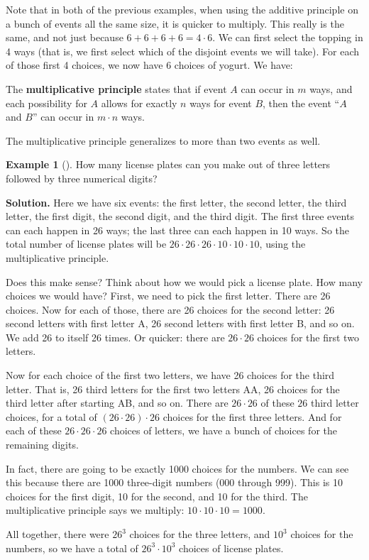 \documentclass[10pt,]{book}
\newcommand{\terminology}[1]{\textbf{#1}}
\theoremstyle{plain}
\theoremstyle{definition}
\theoremstyle{definition}
\newtheorem{example}[theorem]{Example}
\theoremstyle{definition}
\theoremstyle{definition}
\numberwithin{equation}{chapter}
\begin{document}
\hypertarget{p-684}{}%
Note that in both of the previous examples, when using the additive principle on a bunch of events all the same size, it is quicker to multiply. This really is the same, and not just because \(6 + 6 + 6 + 6 = 4\cdot 6\). We can first select the topping in 4 ways (that is, we first select which of the disjoint events we will take). For each of those first 4 choices, we now have 6 choices of yogurt. We have:%
\begin{assemblage}\label{assemblage-12}
\hypertarget{p-685}{}%
The \terminology{multiplicative principle} states that if event \(A\) can occur in \(m\) ways, and each possibility for \(A\) allows for exactly \(n\) ways for event \(B\), then the event ``\(A\) and \(B\)'' can occur in \(m \cdot n\) ways.%
\end{assemblage}
\hypertarget{p-686}{}%
The multiplicative principle generalizes to more than two events as well.%
\begin{example}[]\label{example-37}
\hypertarget{p-687}{}%
How many license plates can you make out of three letters followed by three numerical digits?%
\par\smallskip%
\noindent\textbf{Solution.}\hypertarget{solution-78}{}\quad%
\hypertarget{p-688}{}%
Here we have six events: the first letter, the second letter, the third letter, the first digit, the second digit, and the third digit. The first three events can each happen in 26 ways; the last three can each happen in 10 ways. So the total number of license plates will be \(26\cdot 26\cdot 26 \cdot 10 \cdot 10 \cdot 10\), using the multiplicative principle.%
\par
\hypertarget{p-689}{}%
Does this make sense? Think about how we would pick a license plate. How many choices we would have? First, we need to pick the first letter. There are 26 choices. Now for each of those, there are 26 choices for the second letter: 26 second letters with first letter A, 26 second letters with first letter B, and so on. We add 26 to itself 26 times. Or quicker: there are \(26 \cdot 26\) choices for the first two letters.%
\par
\hypertarget{p-690}{}%
Now for each choice of the first two letters, we have 26 choices for the third letter. That is, 26 third letters for the first two letters AA, 26 choices for the third letter after starting AB, and so on. There are \(26 \cdot 26\) of these \(26\) third letter choices, for a total of \((26\cdot26)\cdot 26\) choices for the first three letters. And for each of these \(26\cdot26\cdot26\) choices of letters, we have a bunch of choices for the remaining digits.%
\par
\hypertarget{p-691}{}%
In fact, there are going to be exactly 1000 choices for the numbers. We can see this because there are 1000 three-digit numbers (000 through 999). This is 10 choices for the first digit, 10 for the second, and 10 for the third. The multiplicative principle says we multiply: \(10\cdot 10 \cdot 10 = 1000\).%
\par
\hypertarget{p-692}{}%
All together, there were \(26^3\) choices for the three letters, and \(10^3\) choices for the numbers, so we have a total of \(26^3 \cdot 10^3\) choices of license plates.%
\end{example}
\end{document}
